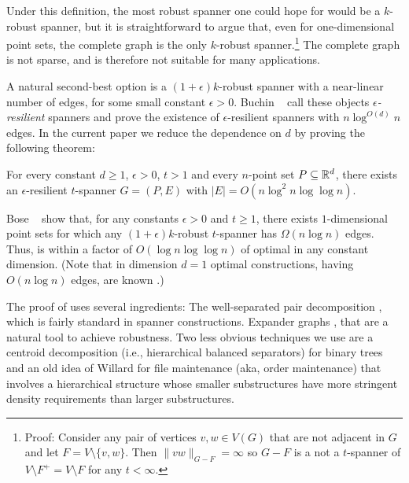 \documentclass{patmorin}
\begin{document}
Under this definition, the most robust spanner one could hope for
would be a $k$-robust spanner, but it is straightforward to argue
that, even for one-dimensional point sets, the complete graph is the
only $k$-robust spanner.\footnote{Proof: Consider any pair of vertices
$v,w\in V(G)$ that are not adjacent in $G$ and let $F=V\setminus\{v,w\}$.
Then $\|vw\|_{G-F}=\infty$ so $G-F$ is a not a $t$-spanner of $V\setminus
F^+=V\setminus F$ for any $t<\infty$.} The complete graph is not sparse,
and is therefore not suitable for many applications.

A natural second-best option is a $(1+\epsilon)k$-robust spanner with
a near-linear number of edges, for some small constant $\epsilon >0$.
Buchin \etal\ \cite{buchin.har-peled.ea:spanner} call these objects
\emph{$\epsilon$-resilient} spanners and prove the existence of
$\epsilon$-resilient spanners with $n\log^{O(d)} n$ edges.
In the current paper we reduce the dependence on $d$ by proving the
following theorem:

\begin{thm}
  For every constant $d\ge 1$, $\epsilon>0$, $t>1$ and every $n$-point
  set $P\subseteq\mathbb{R}^d$, there exists an $\epsilon$-resilient $t$-spanner
  $G=(P,E)$ with $|E|=O(n\log^2 n\log\log n)$.
\end{thm}

Bose \etal\ \cite{bose.dujmovic.ea:robust} show that, for any constants
$\epsilon>0$ and $t\ge 1$, there exists $1$-dimensional point sets
for which any $(1+\epsilon)k$-robust $t$-spanner has $\Omega(n\log
n)$ edges.  Thus,  is within a factor of $O(\log
n\log\log n)$ of optimal in any constant dimension.  (Note that in
dimension $d=1$ optimal constructions, having $O(n\log n)$ edges, are
known \cite{buchin.har-peled.ea:spanner}.)

The proof of  uses several ingredients: The well-separated
pair decomposition \cite{callahan.kosaraju:decomposition}, which
is fairly standard in spanner constructions.  Expander graphs
\cite{hoory.linial.ea:expanders}, that are a natural tool to
achieve robustness. Two less obvious techniques we use are a centroid
decomposition (i.e., hierarchical balanced separators) for binary trees
and an old idea of Willard \cite{willard:maintaining} for file maintenance
(aka, order maintenance) that involves a hierarchical structure whose
smaller substructures have more stringent density requirements than
larger substructures.
\end{document}
